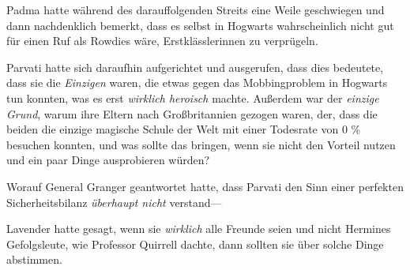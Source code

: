 Padma hatte während des darauffolgenden Streits eine Weile geschwiegen und dann nachdenklich bemerkt, dass es selbst in Hogwarts wahrscheinlich nicht gut für einen Ruf als Rowdies wäre, Erstklässlerinnen zu verprügeln.

Parvati hatte sich daraufhin aufgerichtet und ausgerufen, dass dies bedeutete, dass sie die \emph{Einzigen} waren, die etwas gegen das Mobbingproblem in Hogwarts tun konnten, was es erst \emph{wirklich heroisch} machte. Außerdem war der \emph{einzige} \emph{Grund}, warum ihre Eltern nach Großbritannien gezogen waren, der, dass die beiden die einzige magische Schule der Welt mit einer Todesrate von 0 \% besuchen konnten, und was sollte das bringen, wenn sie nicht den Vorteil nutzen und ein paar Dinge ausprobieren würden?

Worauf General Granger geantwortet hatte, dass Parvati den Sinn einer perfekten Sicherheitsbilanz \emph{überhaupt nicht} verstand—

Lavender hatte gesagt, wenn sie \emph{wirklich} alle Freunde seien und nicht Hermines Gefolgsleute, wie Professor Quirrell dachte, dann sollten sie über solche Dinge abstimmen.

